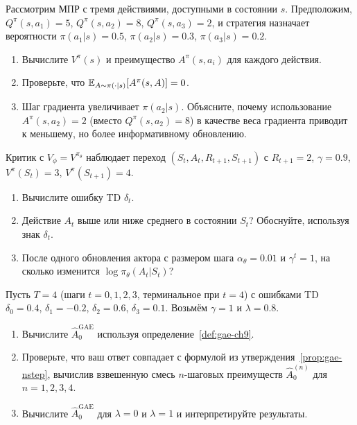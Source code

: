 \begin{exercise}
\label{ex:advantage-computation}
Рассмотрим МПР с тремя действиями, доступными в состоянии $s$. Предположим, $Q^{\pi}(s, a_1) = 5$, $Q^{\pi}(s, a_2) = 8$, $Q^{\pi}(s, a_3) = 2$, и стратегия назначает вероятности $\pi(a_1|s) = 0.5$, $\pi(a_2|s) = 0.3$, $\pi(a_3|s) = 0.2$.
\begin{enumerate}[label=(\alph*)]
  \item Вычислите $V^\pi(s)$ и преимущество $A^\pi(s, a_i)$ для каждого действия.
  \item Проверьте, что $\operatorname{\mathbb{E}}_{A \sim \pi(\cdot|s)}[A^\pi(s,A)] = 0$.
  \item Шаг градиента увеличивает $\pi(a_2|s)$. Объясните, почему использование $A^\pi(s,a_2) = 2$ (вместо $Q^\pi(s,a_2) = 8$) в качестве веса градиента приводит к меньшему, но более информативному обновлению.
\end{enumerate}
\end{exercise}

\begin{exercise}
\label{ex:td-advantage-numeric}
Критик с $V_\phi = V^{\pi_\theta}$ наблюдает переход $(S_t, A_t, R_{t+1}, S_{t+1})$ с $R_{t+1} = 2$, $\gamma = 0.9$, $V^\pi(S_t) = 3$, $V^\pi(S_{t+1}) = 4$.
\begin{enumerate}[label=(\alph*)]
  \item Вычислите ошибку TD $\delta_t$.
  \item Действие $A_t$ выше или ниже среднего в состоянии $S_t$? Обоснуйте, используя знак $\delta_t$.
  \item После одного обновления актора с размером шага $\alpha_\theta = 0.01$ и $\gamma^t = 1$, на сколько изменится $\log \pi_\theta(A_t|S_t)$?
\end{enumerate}
\end{exercise}

\begin{exercise}
\label{ex:gae-derivation}
Пусть $T = 4$ (шаги $t = 0,1,2,3$, терминальное при $t=4$) с ошибками TD $\delta_0 = 0.4$, $\delta_1 = -0.2$, $\delta_2 = 0.6$, $\delta_3 = 0.1$. Возьмём $\gamma = 1$ и $\lambda = 0.8$.
\begin{enumerate}[label=(\alph*)]
  \item Вычислите $\hat{A}_0^{\mathrm{GAE}}$ используя определение~\ref{def:gae-ch9}.
  \item Проверьте, что ваш ответ совпадает с формулой из утверждения~\ref{prop:gae-nstep}, вычислив взвешенную смесь $n$-шаговых преимуществ $\hat{A}_0^{(n)}$ для $n = 1, 2, 3, 4$.
  \item Вычислите $\hat{A}_0^{\mathrm{GAE}}$ для $\lambda = 0$ и $\lambda = 1$ и интерпретируйте результаты.
\end{enumerate}
\end{exercise}


